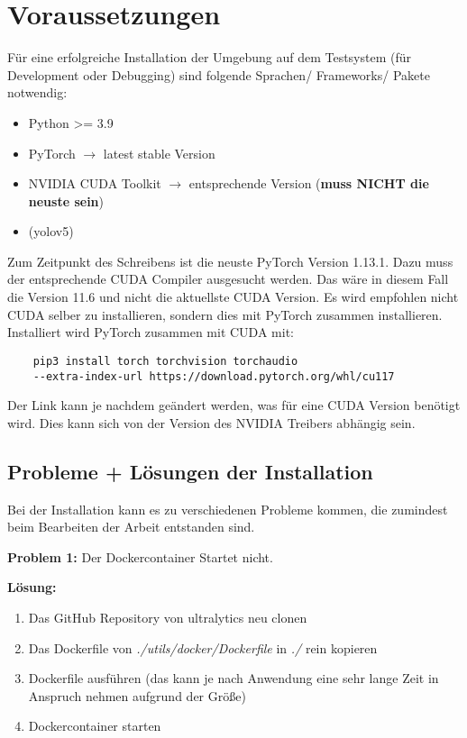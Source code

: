 \chapter{Voraussetzungen}

Für eine erfolgreiche Installation der Umgebung auf dem Testsystem (für Development oder Debugging) sind folgende Sprachen/ Frameworks/ Pakete notwendig:
\begin{itemize}
    \item Python >= 3.9
    \item PyTorch $\rightarrow$ latest stable Version
    \item NVIDIA CUDA Toolkit $\rightarrow$ entsprechende Version (\textbf{muss NICHT die neuste sein})
    \item (yolov5)
\end{itemize}

Zum Zeitpunkt des Schreibens ist die neuste PyTorch Version 1.13.1. Dazu muss der entsprechende CUDA Compiler ausgesucht werden. Das wäre in diesem Fall die Version 11.6 und nicht die aktuellste CUDA Version. Es wird empfohlen nicht CUDA selber zu installieren, sondern dies mit PyTorch zusammen installieren. Installiert wird PyTorch zusammen mit CUDA mit:
\begin{verbatim}
    pip3 install torch torchvision torchaudio 
    --extra-index-url https://download.pytorch.org/whl/cu117
\end{verbatim}
Der Link kann je nachdem geändert werden, was für eine CUDA Version benötigt wird. Dies kann sich von der Version des NVIDIA Treibers abhängig sein.
\section{Probleme + Lösungen der Installation}

Bei der Installation kann es zu verschiedenen Probleme kommen, die zumindest beim Bearbeiten der Arbeit entstanden sind.

\textbf{Problem 1:} Der Dockercontainer Startet nicht.

\textbf{Lösung:} 
\begin{enumerate}
    \item Das GitHub Repository von ultralytics \cite{glennjocher.2023} neu clonen 
    \item Das Dockerfile von \textit{./utils/docker/Dockerfile} in \textit{./} rein kopieren
    \item Dockerfile ausführen  (das kann je nach Anwendung eine sehr lange Zeit in Anspruch nehmen aufgrund der Größe)
    \item Dockercontainer starten
\end{enumerate}

